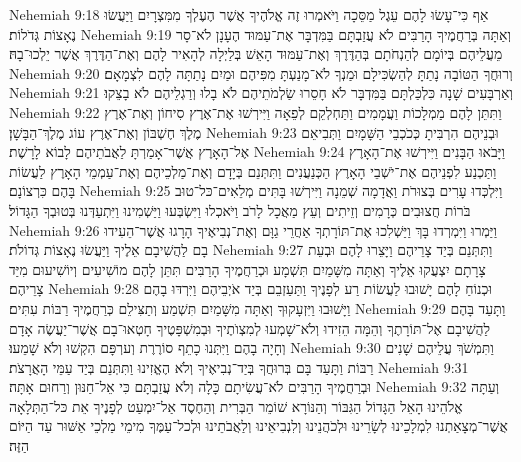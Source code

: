 Nehemiah 9:18	אַף כִּי־עָשׂוּ לָהֶם עֵגֶל מַסֵּכָה וַיֹּאמְרוּ זֶה אֱלֹהֶיךָ אֲשֶׁר הֶעֶלְךָ מִמִּצְרָיִם וַיַּעֲשׂוּ נֶאָצוֹת גְּדֹלוֹת׃
Nehemiah 9:19	וְאַתָּה בְּרַחֲמֶיךָ הָרַבִּים לֹא עֲזַבְתָּם בַּמִּדְבָּר אֶת־עַמּוּד הֶעָנָן לֹא־סָר מֵעֲלֵיהֶם בְּיוֹמָם לְהַנְחֹתָם בְּהַדֶּרֶךְ וְאֶת־עַמּוּד הָאֵשׁ בְּלַיְלָה לְהָאִיר לָהֶם וְאֶת־הַדֶּרֶךְ אֲשֶׁר יֵלְכוּ־בָהּ׃
Nehemiah 9:20	וְרוּחֲךָ הַטּוֹבָה נָתַתָּ לְהַשְׂכִּילָם וּמַנְךָ לֹא־מָנַעְתָּ מִפִּיהֶם וּמַיִם נָתַתָּה לָהֶם לִצְמָאָם׃
Nehemiah 9:21	וְאַרְבָּעִים שָׁנָה כִּלְכַּלְתָּם בַּמִּדְבָּר לֹא חָסֵרוּ שַׂלְמֹתֵיהֶם לֹא בָלוּ וְרַגְלֵיהֶם לֹא בָצֵקוּ׃
Nehemiah 9:22	וַתִּתֵּן לָהֶם מַמְלָכוֹת וַעֲמָמִים וַתַּחְלְקֵם לְפֵאָה וַיִּירְשׁוּ אֶת־אֶרֶץ סִיחוֹן וְאֶת־אֶרֶץ מֶלֶךְ חֶשְׁבּוֹן וְאֶת־אֶרֶץ עוֹג מֶלֶךְ־הַבָּשָׁן׃
Nehemiah 9:23	וּבְנֵיהֶם הִרְבִּיתָ כְּכֹכְבֵי הַשָּׁמָיִם וַתְּבִיאֵם אֶל־הָאָרֶץ אֲשֶׁר־אָמַרְתָּ לַאֲבֹתֵיהֶם לָבוֹא לָרָשֶׁת׃
Nehemiah 9:24	וַיָּבֹאוּ הַבָּנִים וַיִּירְשׁוּ אֶת־הָאָרֶץ וַתַּכְנַע לִפְנֵיהֶם אֶת־יֹשְׁבֵי הָאָרֶץ הַכְּנַעֲנִים וַתִּתְּנֵם בְּיָדָם וְאֶת־מַלְכֵיהֶם וְאֶת־עַמְמֵי הָאָרֶץ לַעֲשׂוֹת בָּהֶם כִּרְצוֹנָם׃
Nehemiah 9:25	וַיִּלְכְּדוּ עָרִים בְּצוּרֹת וַאֲדָמָה שְׁמֵנָה וַיִּירְשׁוּ בָּתִּים מְלֵאִים־כּל־טוּב בֹּרוֹת חֲצוּבִים כְּרָמִים וְזֵיתִים וְעֵץ מַאֲכָל לָרֹב וַיֹּאכְלוּ וַיִּשְׂבְּעוּ וַיַּשְׁמִינוּ וַיִּתְעַדְּנוּ בְּטוּבְךָ הַגָּדוֹל׃
Nehemiah 9:26	וַיַּמְרוּ וַיִּמְרְדוּ בָּךְ וַיַּשְׁלִכוּ אֶת־תּוֹרָתְךָ אַחֲרֵי גַוָּם וְאֶת־נְבִיאֶיךָ הָרָגוּ אֲשֶׁר־הֵעִידוּ בָם לַהֲשִׁיבָם אֵלֶיךָ וַיַּעֲשׂוּ נֶאָצוֹת גְּדוֹלֹת׃
Nehemiah 9:27	וַתִּתְּנֵם בְּיַד צָרֵיהֶם וַיָּצֵרוּ לָהֶם וּבְעֵת צָרָתָם יִצְעֲקוּ אֵלֶיךָ וְאַתָּה מִשָּׁמַיִם תִּשְׁמָע וּכְרַחֲמֶיךָ הָרַבִּים תִּתֵּן לָהֶם מוֹשִׁיעִים וְיוֹשִׁיעוּם מִיַּד צָרֵיהֶם׃
Nehemiah 9:28	וּכְנוֹחַ לָהֶם יָשׁוּבוּ לַעֲשׂוֹת רַע לְפָנֶיךָ וַתַּעַזְבֵם בְּיַד אֹיְבֵיהֶם וַיִּרְדּוּ בָהֶם וַיָּשׁוּבוּ וַיִּזְעָקוּךָ וְאַתָּה מִשָּׁמַיִם תִּשְׁמַע וְתַצִּילֵם כְּרַחֲמֶיךָ רַבּוֹת עִתִּים׃
Nehemiah 9:29	וַתָּעַד בָּהֶם לַהֲשִׁיבָם אֶל־תּוֹרָתֶךָ וְהֵמָּה הֵזִידוּ וְלֹא־שָׁמְעוּ לְמִצְוֺתֶיךָ וּבְמִשְׁפָּטֶיךָ חָטְאוּ־בָם אֲשֶׁר־יַעֲשֶׂה אָדָם וְחָיָה בָהֶם וַיִּתְּנוּ כָתֵף סוֹרֶרֶת וְערְפָּם הִקְשׁוּ וְלֹא שָׁמֵעוּ׃
Nehemiah 9:30	וַתִּמְשֹׁךְ עֲלֵיהֶם שָׁנִים רַבּוֹת וַתָּעַד בָּם בְּרוּחֲךָ בְּיַד־נְבִיאֶיךָ וְלֹא הֶאֱזִינוּ וַתִּתְּנֵם בְּיַד עַמֵּי הָאֲרָצֹת׃
Nehemiah 9:31	וּבְרַחֲמֶיךָ הָרַבִּים לֹא־עֲשִׂיתָם כָּלָה וְלֹא עֲזַבְתָּם כִּי אֵל־חַנּוּן וְרַחוּם אָתָּה׃
Nehemiah 9:32	וְעַתָּה אֱלֹהֵינוּ הָאֵל הַגָּדוֹל הַגִּבּוֹר וְהַנּוֹרָא שׁוֹמֵר הַבְּרִית וְהַחֶסֶד אַל־יִמְעַט לְפָנֶיךָ אֵת כּל־הַתְּלָאָה אֲשֶׁר־מְצָאַתְנוּ לִמְלָכֵינוּ לְשָׂרֵינוּ וּלְכֹהֲנֵינוּ וְלִנְבִיאֵינוּ וְלַאֲבֹתֵינוּ וּלְכל־עַמֶּךָ מִימֵי מַלְכֵי אַשּׁוּר עַד הַיּוֹם הַזֶּה׃
